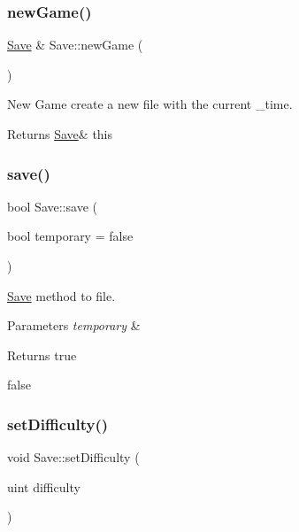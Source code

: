 \subsubsection{\texorpdfstring{new\+Game()}{newGame()}}
{\footnotesize\ttfamily \hyperlink{class_save}{Save} \& Save\+::new\+Game (\begin{DoxyParamCaption}{ }\end{DoxyParamCaption})\hspace{0.3cm}{\ttfamily [static]}}



New Game create a new file with the current \+\_\+time. 

\begin{DoxyReturn}{Returns}
\hyperlink{class_save}{Save}\& this 
\end{DoxyReturn}
\mbox{\label{class_save_a2edbb08ba5ec1f0e9291d246580bd295}} 
\subsubsection{\texorpdfstring{save()}{save()}}
{\footnotesize\ttfamily bool Save\+::save (\begin{DoxyParamCaption}\item[{bool}]{temporary = {\ttfamily false} }\end{DoxyParamCaption})\hspace{0.3cm}{\ttfamily [static]}}



\hyperlink{class_save}{Save} method to file. 


\begin{DoxyParams}{Parameters}
{\em temporary} & \\
\hline
\end{DoxyParams}
\begin{DoxyReturn}{Returns}
true 

false 
\end{DoxyReturn}
\mbox{\label{class_save_ae4305a76f306f9d7ca5991c881d7c98b}} 
\subsubsection{\texorpdfstring{set\+Difficulty()}{setDifficulty()}}
{\footnotesize\ttfamily void Save\+::set\+Difficulty (\begin{DoxyParamCaption}\item[{uint}]{difficulty }\end{DoxyParamCaption})\hspace{0.3cm}{\ttfamily [static]}}



